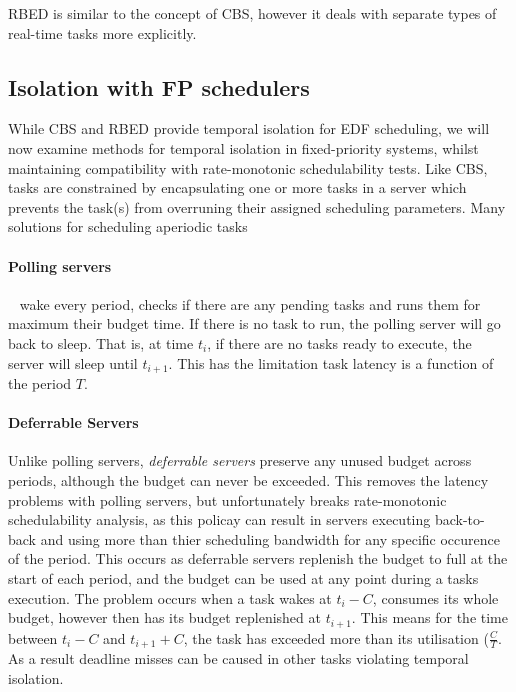 \Gls{RBED} is similar to the concept of CBS, however it deals with separate types of real-time tasks more explicitly.

\subsection{Isolation with FP schedulers}
\label{background:fp-isolation}

While \gls{CBS} and \gls{RBED} provide temporal isolation for \gls{EDF} scheduling, we will now examine methods for temporal isolation in fixed-priority systems, whilst maintaining compatibility with rate-monotonic schedulability tests.
Like \gls{CBS}, tasks are constrained by encapsulating one or more tasks in a server which prevents the task(s) from overruning their assigned scheduling parameters.
Many solutions for scheduling aperiodic tasks

\paragraph{Polling servers}\label{p:polling-servers}~\citep{Lehoczky_LS_87} wake every period, checks if there are any pending tasks and runs them for maximum their budget time. If there is no task to run, the polling server will go back to sleep. That is, at time $t_{i}$, if there are no tasks ready to execute, the server will sleep until $t_{i+1}$. This has the limitation task latency is a function of the period $T$.

\paragraph{Deferrable Servers} Unlike polling servers, \emph{deferrable servers}\citep{Lehoczky_LS_87, Strosnider_LS_95} preserve any unused budget across periods, although the budget can never be exceeded.
This removes the latency problems with polling servers, but unfortunately breaks rate-monotonic schedulability analysis, as this policay can result in servers executing back-to-back and using more than thier scheduling bandwidth for any specific occurence of the period.
This occurs as deferrable servers replenish the budget to full at the start of each period, and the budget can be used at any point during a tasks execution.
The problem occurs when a task wakes at $t_{i} - C$, consumes its whole budget, however then has its budget replenished at $t_{i+1}$.
This means for the time between $t_{i} - C$ and $t_{i+1} + C$, the task has exceeded more than its utilisation ($\frac{C}{T}.$
As a result deadline misses can be caused in other tasks violating temporal isolation.

